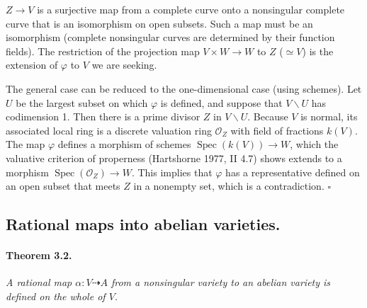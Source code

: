 

\DeclareMathOperator{\Spec}{Spec}       %
\DeclareMathOperator{\Image}{Im}        %
\DeclareMathOperator{\divisor}{div}     %


$Z \to V$ is a surjective map from a complete curve onto a nonsingular
complete curve that is an isomorphism on open subsets. Such a map must be an
isomorphism (complete nonsingular curves are determined by their function
fields). The restriction of the projection map $V \times W \to W$ to $Z$
($\simeq V$) is the extension of $\varphi$ to $V$ we are seeking.

The general case can be reduced to the one-dimensional case (using schemes).
Let $U$ be the largest subset on which $\varphi$ is defined, and suppose
that $V \smallsetminus U$ has codimension 1. Then there is a prime divisor
$Z$ in $V \smallsetminus U$. Because $V$ is normal, its associated local
ring is a discrete valuation ring $\mathcal{O}_Z$ with field of fractions
$k(V)$. The map $\varphi$ defines a morphism of schemes
$\Spec(k(V)) \to W$, which the valuative criterion of properness
(Hartshorne 1977, II 4.7) shows extends to a morphism
$\Spec(\mathcal{O}_Z) \to W$. This implies that $\varphi$ has a
representative defined on an open subset that meets $Z$ in a nonempty set,
which is a contradiction. \hfill $\square$

\subsection*{Rational maps into abelian varieties.}

\paragraph{Theorem 3.2.}
\textit{A rational map $\alpha \colon V \dashrightarrow A$ from a
nonsingular variety to an abelian variety is defined on the whole of $V$.}

